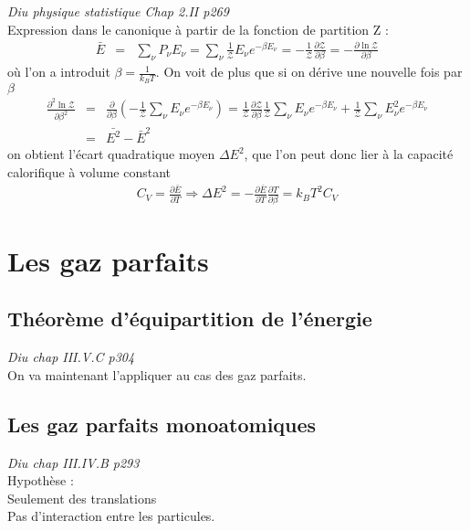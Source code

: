 \documentclass[12pt,prb,aps,epsf]{article}
\begin{document}
\textit{Diu physique statistique Chap 2.II p269}\\
 Expression dans le canonique à partir de la fonction de partition Z :
\begin{eqnarray}
\bar{E} &=& \sum_{\nu} P_{\nu}E_{\nu} = \sum_{\nu}\frac{1}{\mathcal{Z}} E_{\nu} e^{-\beta E_{\nu}} = -\frac{1}{\mathcal{Z}}\frac{\partial \mathcal{Z}}{\partial \beta} = -\frac{\partial \ln \mathcal{Z}}{\partial \beta}
\end{eqnarray}
où l'on a introduit $\beta =\frac{1}{k_BT}$. On voit de plus que si on dérive une nouvelle fois par $\beta$ 
\begin{eqnarray}
\frac{\partial^2 \ln \mathcal{Z}}{\partial \beta^2} &=& \frac{\partial}{\partial \beta}\left(-\frac{1}{\mathcal{Z}}\sum_{\nu}E_{\nu}e^{-\beta E_{\nu}}\right) = \frac{1}{\mathcal{Z}} \frac{\partial \mathcal{Z}}{\partial \beta}\frac{1}{\mathcal{Z}}\sum_{\nu}E_{\nu}e^{-\beta E_{\nu}} + \frac{1}{\mathcal{Z}} \sum_{\nu}E_{\nu}^2e^{-\beta E_{\nu}}\\
&=& \bar{E^2} - \bar{E}^2
\end{eqnarray}
on obtient l'écart quadratique moyen $\Delta E^2$, que l'on peut donc lier à la capacité calorifique à volume constant 
\begin{eqnarray}
C_V = \frac{\partial \bar{E}}{\partial T} \Longrightarrow \Delta E^2 = - \frac{\partial \bar{E}}{\partial T}\frac{\partial T}{\partial \beta} = k_BT^2 C_V
\end{eqnarray}

\section{Les gaz parfaits}
\subsection{Théorème d'équipartition de l'énergie}
\textit{Diu chap III.V.C p304}\\
On va maintenant l'appliquer au cas des gaz parfaits.

\subsection{Les gaz parfaits monoatomiques}
\textit{Diu chap III.IV.B p293}\\

Hypothèse : \\
Seulement des translations\\
Pas d'interaction entre les particules.\\
\end{document}
